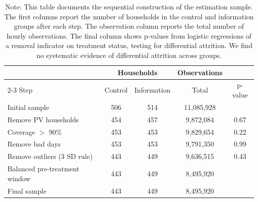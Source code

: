 \begin{table}[H]
\centering
\caption{Sample construction and selection diagnostics}
\label{tab:sample_selection}
\begin{tabular}{lcccc}
\toprule
 & \multicolumn{2}{c}{Households} & Observations &  \\
\cmidrule(lr){2-3}
Step & Control & Information & Total & p-value \\
\midrule

Initial sample 
& 506 & 514 & 11,085,928 &  \\

Remove PV households 
& 454 & 457 & 9,872,084 & 0.67 \\

Coverage $>$ 90\% 
& 453 & 453 & 9,829,654 & 0.22 \\

Remove bad days 
& 453 & 453 & 9,791,350 & 0.99 \\

Remove outliers (3 SD rule) 
& 443 & 449 & 9,636,515 & 0.43 \\

Balanced pre-treatment window 
& 443 & 449 & 8,495,920 &  \\

\midrule
Final sample 
& 443 & 449 & 8,495,920 &  \\

\bottomrule
\end{tabular}

\caption*{\footnotesize
Note: This table documents the sequential construction of the estimation sample. The first columns report the number of households in the control and information groups after each step. The observation column reports the total number of hourly observations. The final column shows p-values from logistic regressions of a removal indicator on treatment status, testing for differential attrition. We find no systematic evidence of differential attrition across groups.}
\end{table}

